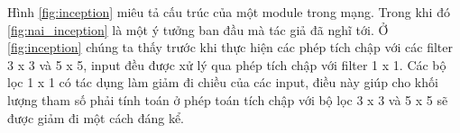 	
	
	Hình \ref{fig:inception} miêu tả cấu trúc của một module trong mạng. Trong khi đó \ref{fig:nai_inception} là một ý tưởng ban đầu mà tác giả đã nghĩ tới. Ở \ref{fig:inception} chúng ta thấy trước khi thực hiện các phép tích chập với các filter 3 x 3 và 5 x 5, input đều được xử lý qua phép tích chập với filter 1 x 1. Các bộ lọc 1 x 1 có tác dụng làm giảm đi chiều của các input\cite{2}, điều này giúp cho khối lượng tham số phải tính toán ở phép toán tích chập với bộ lọc 3 x 3 và 5 x 5 sẽ được giảm đi một cách đáng kể.

		
	
	
	
	
	
